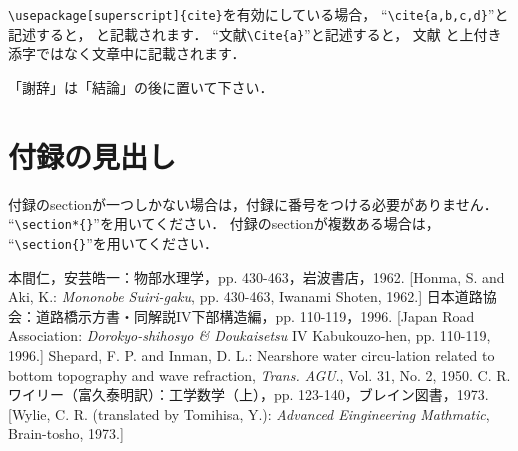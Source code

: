 \documentclass{jjsce}
\begin{document}
\verb|\usepackage[superscript]{cite}|を有効にしている場合，
``\verb|\cite{a,b,c,d}|''と記述すると，
\cite{a,b,c,d} と記載されます．
``文献\verb|\Cite{a}|''と記述すると，
文献\Cite{a} と上付き添字ではなく文章中に記載されます．

\Acknowledgment %
「謝辞」は「結論」の後に置いて下さい．

\appendix
\section*{付録の見出し}
付録のsectionが一つしかない場合は，付録に番号をつける必要がありません．
``\verb|\section*{}|''を用いてください．
付録のsectionが複数ある場合は，
``\verb|\section{}|''を用いてください．

\begin{thebibliography}{9}
本間仁，安芸皓一：物部水理学，pp. 430-463，岩波書店，1962. [Honma, S. and Aki, K.: \textit{Mononobe Suiri-gaku}, pp. 430-463, Iwanami Shoten, 1962.]
日本道路協会：道路橋示方書・同解説IV下部構造編，pp. 110-119，1996. [Japan Road Association: \textit{Dorokyo-shihosyo \& Doukaisetsu} IV Kabukouzo-hen, pp. 110-119, 1996.]
Shepard, F. P. and Inman, D. L.: Nearshore water circu-lation related to bottom topography and wave refraction, \textit{Trans. AGU}., Vol. 31, No. 2, 1950.
C. R. ワイリー（富久泰明訳）：工学数学（上），pp. 123-140，ブレイン図書，1973. [Wylie, C. R. (translated by Tomihisa, Y.): \textit{Advanced Eingineering Mathmatic}, Brain-tosho, 1973.]
\end{thebibliography}
\end{document}
